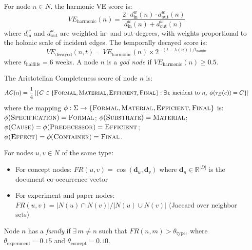 \documentclass{iosart2x}
\begin{document}
\begin{definition}
For node $n \in N$, the harmonic VE score is:
\[
\mathit{VE}_{\text{harmonic}}(n) = \frac{2 \cdot d_{\text{in}}^w(n) \cdot d_{\text{out}}^w(n)}{d_{\text{in}}^w(n) + d_{\text{out}}^w(n)}
\]
where $d_{\text{in}}^w$ and $d_{\text{out}}^w$ are weighted in- and out-degrees, with weights proportional to the holonic scale of incident edges. The temporally decayed score is:
\[
\mathit{VE}_{\text{decayed}}(n, t) = \mathit{VE}_{\text{harmonic}}(n) \times 2^{-(t - \lambda(n)) / t_{\text{halflife}}}
\]
where $t_{\text{halflife}} = 6$ weeks. A node $n$ is a \emph{god node} if $\mathit{VE}_{\text{harmonic}}(n) \geq 0.5$.
\end{definition}

\begin{definition}
The Aristotelian Completeness score of node $n$ is:
\[
\mathit{AC}(n) = \frac{1}{4} \left|\{C \in \{\textsc{Formal}, \textsc{Material}, \textsc{Efficient}, \textsc{Final}\} : \exists\, e \text{ incident to } n,\; \phi(\tau_E(e)) = C\}\right|
\]
where the mapping $\phi : \Sigma \rightarrow \{\textsc{Formal}, \textsc{Material}, \textsc{Efficient}, \textsc{Final}\}$ is:
$\phi(\textsc{Specification}) = \textsc{Formal}$;
$\phi(\textsc{Substrate}) = \textsc{Material}$;
$\phi(\textsc{Cause}) = \phi(\textsc{Predecessor}) = \textsc{Efficient}$;
$\phi(\textsc{Effect}) = \phi(\textsc{Container}) = \textsc{Final}$.
\end{definition}

\begin{definition}
For nodes $u, v \in N$ of the same type:
\begin{itemize}
  \item For concept nodes: $\mathit{FR}(u, v) = \cos(\mathbf{d}_u, \mathbf{d}_v)$ where $\mathbf{d}_n \in \mathbb{R}^{|D|}$ is the document co-occurrence vector
  \item For experiment and paper nodes: $\mathit{FR}(u, v) = |N(u) \cap N(v)| / |N(u) \cup N(v)|$ (Jaccard over neighbor sets)
\end{itemize}
Node $n$ has a \emph{family} if $\exists\, m \neq n$ such that $\mathit{FR}(n, m) > \theta_{\text{type}}$, where $\theta_{\text{experiment}} = 0.15$ and $\theta_{\text{concept}} = 0.10$.
\end{definition}
\end{document}
